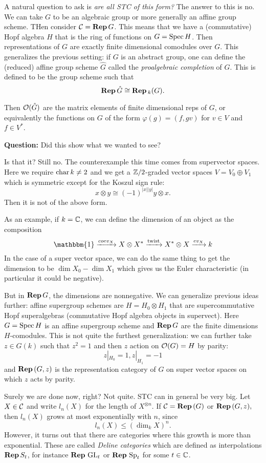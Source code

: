 \documentclass[12pt]{article}
\begin{document}
A natural question to ask is \textit{are all STC of this form?} The answer to this is no. We can take $G$ to be an algebraic group or more generally an affine group scheme. THen consider $\mathcal{C}=\mathbf{Rep}\, G$. This means that we have a (commutative) Hopf algebra $H$ that is the ring of functions on $G=\operatorname{Spec} H$. Then representations of $G$ are exactly finite dimensional comodules over $G$. This generalizes the previous setting: if $G$ is an abstract group, one can define the (reduced) affine group scheme $\widehat G$ called the \emph{proalgebraic completion} of $G$. This is defined to be the group scheme such that
\[\mathbf{Rep}\, \hat G\cong \mathbf{Rep}\,_k(G).\]

Then $\mathcal{O}(\hat G)$ are the matrix elements of finite dimensional reps of $G$, or equivalently the functions on $G$ of the form $\varphi(g)=(f, gv)$ for $v\in V$ and $f\in V^\ast$.

\textbf{Question:} Did this show what we wanted to see?

Is that it? Still no. The counterexample this time comes from supervector spaces. Here we require $\operatorname{char} k\ne 2$ and we get a $\mathbb{Z}/2$-graded vector spaces $V=V_0\oplus V_1$ which is symmetric except for the Koszul sign rule:
\[x\otimes y\cong (-1)^{|x||y|}y\otimes x.\]
Then it is not of the above form.

As an example, if $k=\mathbb{C}$, we can define the dimension of an object as the composition
\[\mathbbm{1}\xrightarrow{coev_X}X\otimes X^\ast\xrightarrow{\mathrm{twist}}X^\ast\otimes X\xrightarrow{ev_X} k\]
In the case of a super vector space, we can do the same thing to get the dimension to be $\dim X_0-\dim X_1$ which gives us the Euler characteristic (in particular it could be negative).

But in $\mathbf{Rep}\, G$, the dimensions are nonnegative. We can generalize previous ideas further: affine supergroup schemes are $H=H_0\otimes H_1$ that are supercommutative Hopf superalgebras (commutative Hopf algebra objects in supervect). Here $G=\operatorname{Spec} H$ is an affine supergroup scheme and $\mathbf{Rep}\, G$ are the finite dimensions $H$-comodules. This is not quite the furthest generalization: we can further take $z\in G(k)$ such that $z^2=1$ and then $z$ action on $\mathcal{O}(G)=H$ by parity:
\[z|_{H_0}=1,z|_{H_1}=-1\]
and $\mathbf{Rep}\,(G,z)$ is the representation category of $G$ on super vector spaces on which $z$ acts by parity.

Surely we are done now, right? Not quite. STC can in general be very big. Let $X\in\mathcal{C}$ and write $l_n(X)$ for the length of $X^{\otimes n}$. If $\mathcal{C}=\mathbf{Rep}\,(G)$
or $\mathbf{Rep}\,(G,z),$ then $l_n(X)$ grows at most exponentially with $n$, since 
\[l_n(X)\le (\dim_k X)^n.\]
However, it turns out that there are categories where this growth is more than exponential. These are called \emph{Deline categories} which are defined as interpolations $\mathbf{Rep}\, S_t$, for instance $\mathbf{Rep}\, \operatorname{GL}_t$ or $\mathbf{Rep}\, \operatorname{Sp}_t$ for some $t\in \mathbb{C}$. 
\end{document}
